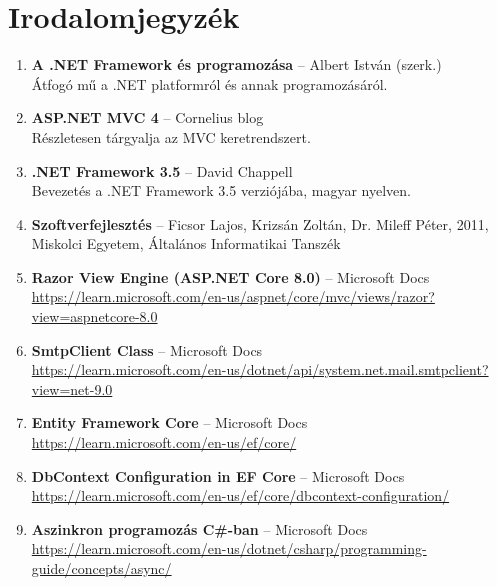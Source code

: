 \section*{Irodalomjegyzék}

\begin{enumerate}
    \item \label{ref:albert_dotnet} \textbf{A .NET Framework és programozása} – Albert István (szerk.)\\
    Átfogó mű a .NET platformról és annak programozásáról.

    \item \label{ref:cornelius_mvc} \textbf{ASP.NET MVC 4} – Cornelius blog\\
    Részletesen tárgyalja az MVC keretrendszert. 

    \item \label{ref:chappell_dotnet} \textbf{.NET Framework 3.5} – David Chappell\\
    Bevezetés a .NET Framework 3.5 verziójába, magyar nyelven.

    \item \label{ref:ficsor_szoftver} \textbf{Szoftverfejlesztés} – Ficsor Lajos, Krizsán Zoltán, Dr. Mileff Péter, 2011, Miskolci Egyetem, Általános Informatikai Tanszék

    \item \label{ref:razor_docs} \textbf{Razor View Engine (ASP.NET Core 8.0)} – Microsoft Docs\\
    \url{https://learn.microsoft.com/en-us/aspnet/core/mvc/views/razor?view=aspnetcore-8.0}

    \item \label{ref:smtp_client} \textbf{SmtpClient Class} – Microsoft Docs\\
    \url{https://learn.microsoft.com/en-us/dotnet/api/system.net.mail.smtpclient?view=net-9.0}

    \item \label{ref:ef_core} \textbf{Entity Framework Core} – Microsoft Docs\\
    \url{https://learn.microsoft.com/en-us/ef/core/}

    \item \label{ref:ef_dbcontext} \textbf{DbContext Configuration in EF Core} – Microsoft Docs\\
    \url{https://learn.microsoft.com/en-us/ef/core/dbcontext-configuration/}

    \item \label{ref:async_programozas} \textbf{Aszinkron programozás C\#-ban} – Microsoft Docs\\
    \url{https://learn.microsoft.com/en-us/dotnet/csharp/programming-guide/concepts/async/}


\end{enumerate}
